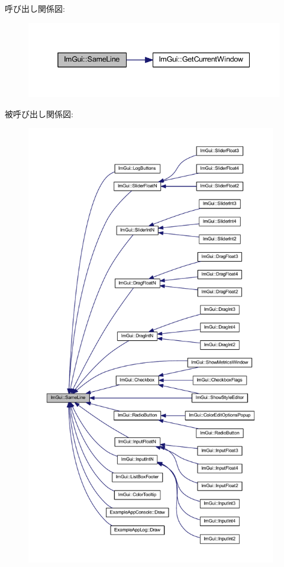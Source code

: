 呼び出し関係図\+:\nopagebreak
\begin{figure}[H]
\begin{center}
\leavevmode
\includegraphics[width=338pt]{namespace_im_gui_a9a01bed1445b5b7edaf0af6a31c08d2c_cgraph}
\end{center}
\end{figure}
被呼び出し関係図\+:\nopagebreak
\begin{figure}[H]
\begin{center}
\leavevmode
\includegraphics[height=550pt]{namespace_im_gui_a9a01bed1445b5b7edaf0af6a31c08d2c_icgraph}
\end{center}
\end{figure}
\mbox{\label{namespace_im_gui_abf1d7a83c5f0a555bbe7f831b0319c8a}} 
